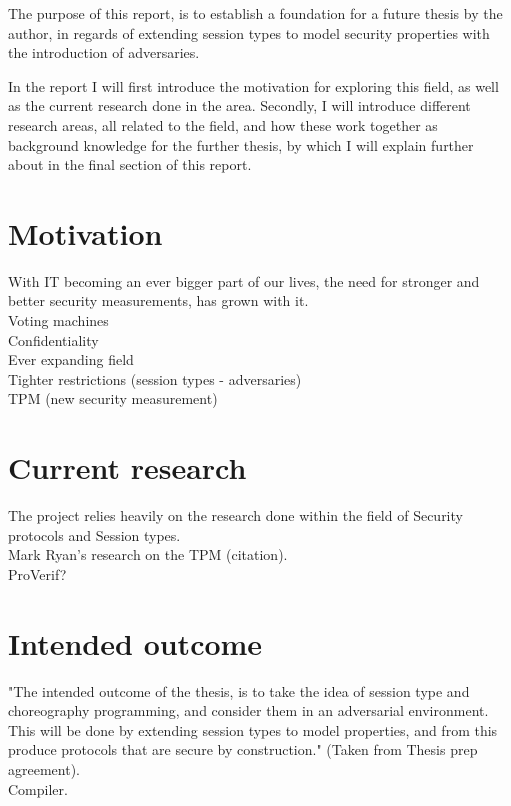 \label{chap:Introduction}
The purpose of this report, is to establish a foundation for a future thesis by the author, in regards of extending session types to model security properties with the introduction of adversaries.

In the report I will first introduce the motivation for exploring this field, as well as the current research done in the area. Secondly, I will introduce different research areas, all related to the field, and how these work together as background knowledge for the further thesis, by which I will explain further about in the final section of this report. 

\section{Motivation}
With IT becoming an ever bigger part of our lives, the need for stronger and better security measurements, has grown with it. \\
Voting machines \\
Confidentiality \\
Ever expanding field \\
Tighter restrictions (session types - adversaries) \\
TPM (new security measurement) \\

\section{Current research}
The project relies heavily on the research done within the field of Security protocols and Session types. \\
Mark Ryan's research on the TPM (citation). \\
ProVerif?

\section{Intended outcome}
"The intended outcome of the thesis, is to take the idea of session type and choreography programming, and consider them in an adversarial environment. This will be done by extending session types to model properties, and
from this produce protocols that are secure by construction." (Taken from Thesis prep agreement). \\
Compiler.
